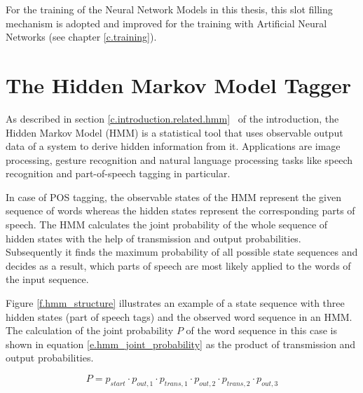 For the training of the Neural Network Models in this thesis, this slot filling mechanism is adopted and improved for the training with Artificial Neural Networks (see chapter \ref{c.training}).

\section{The Hidden Markov Model Tagger}\label{c.alex.hmm}
As described in section \ref{c.introduction.related.hmm} \ of the introduction, the Hidden Markov Model (HMM) is a statistical tool that uses observable output data of a system to derive hidden information from it. Applications are image processing, gesture recognition and natural language processing tasks like speech recognition and part-of-speech tagging in particular.

In case of POS tagging, the observable states of the HMM represent the given sequence of words whereas the hidden states represent the corresponding parts of speech. The HMM calculates the joint probability of the whole sequence of hidden states with the help of transmission and output probabilities. Subsequently it finds the maximum probability of all possible state sequences and decides as a result, which parts of speech are most likely applied to the words of the input sequence.

Figure \ref{f.hmm_structure} illustrates an example of a state sequence with three hidden states (part of speech tags) and the observed word sequence in an HMM. The calculation of the joint probability $P$ of the word sequence in this case is shown in equation \ref{e.hmm_joint_probability} as the product of transmission and output probabilities.

\begin{equation}
    P = p_{start}\cdot p_{out,1}\cdot p_{trans,1}\cdot p_{out,2}\cdot p_{trans,2}\cdot p_{out,3} \label{e.hmm_joint_probability}
\end{equation}


